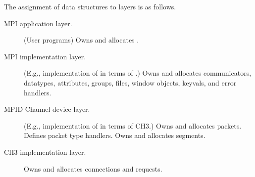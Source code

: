 \documentclass{article}
\begin{document}
The assignment of data structures to layers is as follows.
\begin{description}
\item[MPI application layer.](User programs) Owns and allocates
  . 
\item[MPI implementation layer.](E.g., implementation of  in
  terms of .) Owns and allocates communicators, datatypes,
  attributes, groups, files, window objects, keyvals, and error handlers.
\item[MPID Channel device layer.](E.g., implementation of
   in terms of CH3.) Owns and allocates packets.
  Defines packet type handlers.  Owns and allocates segments.
\item[CH3 implementation layer.] Owns and allocates connections and requests.
\end{description}












\end{document}
